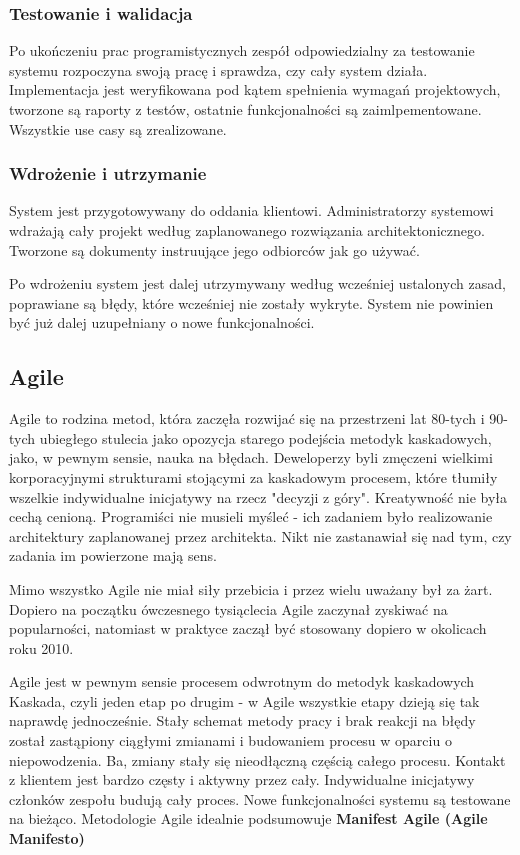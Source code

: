 \documentclass{article}
\begin{document}
\subsubsection*{Testowanie i walidacja}
Po ukończeniu prac programistycznych zespół odpowiedzialny za testowanie systemu rozpoczyna swoją pracę i sprawdza, czy cały system działa. Implementacja jest weryfikowana pod kątem spełnienia wymagań projektowych, tworzone są raporty z testów, ostatnie funkcjonalności są zaimlpementowane. Wszystkie use casy są zrealizowane.

\subsubsection*{Wdrożenie i utrzymanie}
System jest przygotowywany do oddania klientowi. Administratorzy systemowi wdrażają cały projekt według zaplanowanego rozwiązania architektonicznego. Tworzone są dokumenty instruujące jego odbiorców jak go używać.

Po wdrożeniu system jest dalej utrzymywany według wcześniej ustalonych zasad, poprawiane są błędy, które wcześniej nie zostały wykryte. System nie powinien być już dalej uzupełniany o nowe funkcjonalności.

\subsection{Agile}
Agile to rodzina metod, która zaczęła rozwijać się na przestrzeni lat 80-tych i 90-tych ubiegłego stulecia jako opozycja starego podejścia metodyk kaskadowych\cite{scrum}, jako, w pewnym sensie, nauka na błędach. Deweloperzy byli zmęczeni wielkimi korporacyjnymi strukturami stojącymi za kaskadowym procesem, które tłumiły wszelkie indywidualne inicjatywy na rzecz "decyzji z góry". Kreatywność nie była cechą cenioną. Programiści nie musieli myśleć - ich zadaniem było realizowanie architektury zaplanowanej przez architekta. Nikt nie zastanawiał się nad tym, czy zadania im powierzone mają sens.

Mimo wszystko Agile nie miał siły przebicia i przez wielu uważany był za żart. Dopiero na początku ówczesnego tysiąclecia Agile zaczynał zyskiwać na popularności, natomiast w praktyce zaczął być stosowany dopiero w okolicach roku 2010.

Agile jest w pewnym sensie procesem odwrotnym do metodyk kaskadowych\cite{scrum} Kaskada, czyli jeden etap po drugim - w Agile wszystkie etapy dzieją się tak naprawdę jednocześnie. Stały schemat metody pracy i brak reakcji na błędy został zastąpiony ciągłymi zmianami i budowaniem procesu w oparciu o niepowodzenia. Ba, zmiany stały się nieodłączną częścią całego procesu. Kontakt z klientem jest bardzo częsty i aktywny przez cały. Indywidualne inicjatywy członków zespołu budują cały proces. Nowe funkcjonalności systemu są testowane na bieżąco. Metodologie Agile idealnie podsumowuje \textbf{Manifest Agile (Agile Manifesto)}
\end{document}
